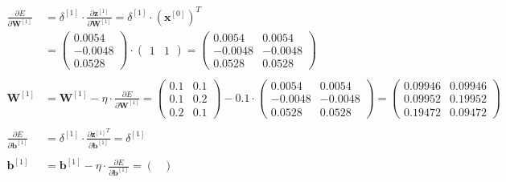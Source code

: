 \documentclass[12pt]{article}
\begin{document}
\begin{enumerate}
\begin{equation*}
    \begin{aligned}
        \frac{\partial E}{\partial \mathbf{W}^{[1]}} &= \delta^{[1]} \cdot \frac{\partial \mathbf{z}^{[1]}}{\partial \mathbf{W}^{[1]}} = \delta^{[1]} \cdot \left(\mathbf{x}^{[0]}\right)^T \\
        &= \begin{pmatrix}
            0.0054 \\
            -0.0048 \\
            0.0528
        \end{pmatrix} \cdot \begin{pmatrix}
            1 & 1 
        \end{pmatrix} = \begin{pmatrix}
            0.0054 & 0.0054\\
            -0.0048 & -0.0048\\
            0.0528 & 0.0528
        \end{pmatrix}\\
        \\
        \mathbf{W}^{[1]} &= \mathbf{W}^{[1]} - \eta \cdot \frac{\partial E}{\partial \mathbf{W}^{[1]}} = \begin{pmatrix}
            0.1 & 0.1\\
            0.1 & 0.2\\
            0.2 & 0.1
        \end{pmatrix} - 0.1 \cdot \begin{pmatrix}
            0.0054 & 0.0054\\
            -0.0048 & -0.0048\\
            0.0528 & 0.0528
        \end{pmatrix} = \begin{pmatrix}
            0.09946 & 0.09946\\
            0.09952 & 0.19952\\
            0.19472 & 0.09472
        \end{pmatrix}\\
        \\
        \frac{\partial E}{\partial \mathbf{b}^{[1]}}&= \delta^{[1]} \cdot \frac{{\partial \mathbf{z}^{[1]}}^T}{\partial \mathbf{b}^{[1]}} = \delta^{[1]}\\
        \\
        \mathbf{b}^{[1]} &= \mathbf{b}^{[1]} - \eta \cdot \frac{\partial E}{\partial \mathbf{b}^{[1]}} = \begin{pmatrix}

\end{pmatrix}
\end{aligned}
\end{equation*}
\end{enumerate}
\end{document}

